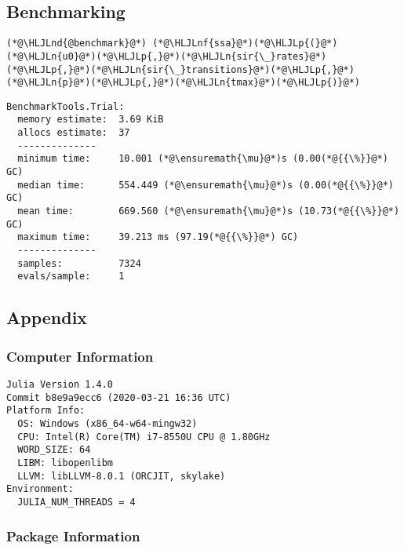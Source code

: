 \documentclass[12pt,a4paper]{article}
\newcommand{\HLJLn}[1]{#1}
\newcommand{\HLJLnd}[1]{\textcolor[RGB]{214,102,97}{#1}}
\newcommand{\HLJLnf}[1]{\textcolor[RGB]{66,102,213}{#1}}
\newcommand{\HLJLp}[1]{#1}
\begin{document}
\subsection{Benchmarking}

\begin{lstlisting}
(*@\HLJLnd{@benchmark}@*) (*@\HLJLnf{ssa}@*)(*@\HLJLp{(}@*)(*@\HLJLn{u0}@*)(*@\HLJLp{,}@*)(*@\HLJLn{sir{\_}rates}@*)(*@\HLJLp{,}@*)(*@\HLJLn{sir{\_}transitions}@*)(*@\HLJLp{,}@*)(*@\HLJLn{p}@*)(*@\HLJLp{,}@*)(*@\HLJLn{tmax}@*)(*@\HLJLp{)}@*)
\end{lstlisting}

\begin{lstlisting}
BenchmarkTools.Trial: 
  memory estimate:  3.69 KiB
  allocs estimate:  37
  --------------
  minimum time:     10.001 (*@\ensuremath{\mu}@*)s (0.00(*@{{\%}}@*) GC)
  median time:      554.449 (*@\ensuremath{\mu}@*)s (0.00(*@{{\%}}@*) GC)
  mean time:        669.560 (*@\ensuremath{\mu}@*)s (10.73(*@{{\%}}@*) GC)
  maximum time:     39.213 ms (97.19(*@{{\%}}@*) GC)
  --------------
  samples:          7324
  evals/sample:     1
\end{lstlisting}



\subsection{Appendix}

\subsubsection{Computer Information}

\begin{verbatim}
Julia Version 1.4.0
Commit b8e9a9ecc6 (2020-03-21 16:36 UTC)
Platform Info:
  OS: Windows (x86_64-w64-mingw32)
  CPU: Intel(R) Core(TM) i7-8550U CPU @ 1.80GHz
  WORD_SIZE: 64
  LIBM: libopenlibm
  LLVM: libLLVM-8.0.1 (ORCJIT, skylake)
Environment:
  JULIA_NUM_THREADS = 4

\end{verbatim}

\subsubsection{Package Information}
\end{document}
